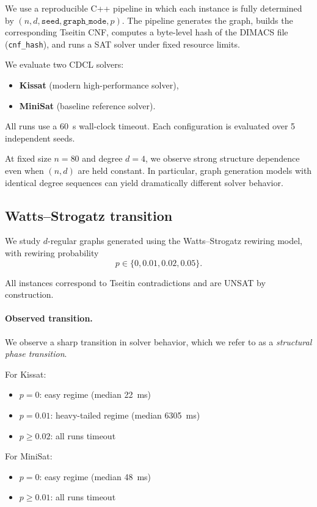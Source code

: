 \documentclass[11pt,a4paper]{article}
\theoremstyle{remark}
\begin{document}
We use a reproducible C++ pipeline in which each instance is fully determined by
$(n,d,\texttt{seed},\texttt{graph\_mode},p)$.
The pipeline generates the graph, builds the corresponding Tseitin CNF,
computes a byte-level hash of the DIMACS file (\texttt{cnf\_hash}),
and runs a SAT solver under fixed resource limits.

We evaluate two CDCL solvers:
\begin{itemize}
  \item \textbf{Kissat} (modern high-performance solver),
  \item \textbf{MiniSat} (baseline reference solver).
\end{itemize}

All runs use a \SI{60}{\second} wall-clock timeout.
Each configuration is evaluated over 5 independent seeds.

At fixed size $n=80$ and degree $d=4$, we observe strong structure dependence
even when $(n,d)$ are held constant.
In particular, graph generation models with identical degree sequences can yield
dramatically different solver behavior.

\subsection{Watts--Strogatz transition}

We study $d$-regular graphs generated using the Watts--Strogatz rewiring model,
with rewiring probability
\[
p \in \{0, 0.01, 0.02, 0.05\}.
\]

All instances correspond to Tseitin contradictions and are UNSAT by construction.

\paragraph{Observed transition.}

We observe a sharp transition in solver behavior, which we refer to as a
\emph{structural phase transition}.

For Kissat:
\begin{itemize}
  \item $p=0$: easy regime (median \SI{22}{\milli\second})
  \item $p=0.01$: heavy-tailed regime (median \SI{6305}{\milli\second})
  \item $p \ge 0.02$: all runs timeout
\end{itemize}

For MiniSat:
\begin{itemize}
  \item $p=0$: easy regime (median \SI{48}{\milli\second})
  \item $p \ge 0.01$: all runs timeout
\end{itemize}
\end{document}
